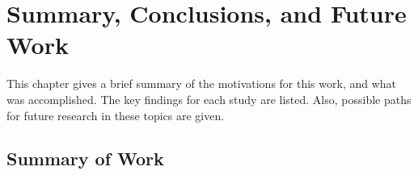 \chapter{Summary, Conclusions, and Future Work}{
  \label{ch:Conclusions}
  This chapter gives a brief summary of the motivations for this work, and what was accomplished.
  The key findings for each study are listed.
  Also, possible paths for future research in these topics are given.

  \section{Summary of Work}{\label{sec:Summary of Work}
}}
